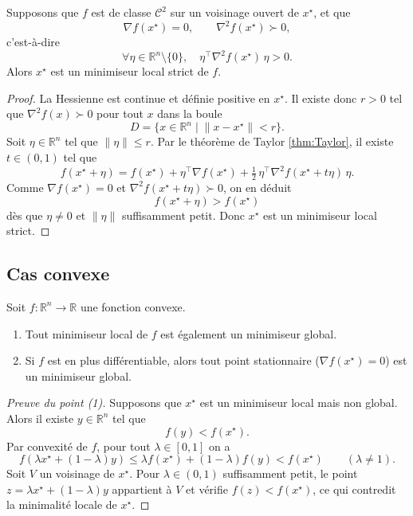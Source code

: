 \begin{theoreme}
\label{thm:second-order-sufficient}
Supposons que $f$ est de classe $\mathcal{C}^2$ sur un voisinage ouvert de $x^\star$,
et que
\[
    \nabla f(x^\star) = 0,\qquad
    \nabla^2 f(x^\star) \succ 0,
\]
c’est-à-dire
\[
    \forall \eta \in \mathbb{R}^n\setminus\{0\},\quad
    \eta^\top \nabla^2 f(x^\star)\,\eta > 0.
\]
Alors $x^\star$ est un minimiseur local strict de $f$.
\end{theoreme}

\begin{proof}
La Hessienne est continue et définie positive en $x^\star$. Il existe donc $r>0$ tel que
$\nabla^2 f(x) \succ 0$ pour tout $x$ dans la boule
\[
    D = \{ x \in \mathbb{R}^n \;|\; \|x - x^\star\| < r \}.
\]
Soit $\eta \in \mathbb{R}^n$ tel que $\|\eta\| \le r$.
Par le théorème de Taylor \ref{thm:Taylor}, il existe $t \in (0,1)$ tel que
\[
    f(x^\star + \eta)
    = f(x^\star)
      + \eta^\top \nabla f(x^\star)
      + \tfrac{1}{2}\,\eta^\top \nabla^2 f(x^\star + t\eta)\,\eta.
\]
Comme $\nabla f(x^\star) = 0$ et $\nabla^2 f(x^\star + t\eta) \succ 0$, on en déduit
\[
    f(x^\star + \eta) > f(x^\star)
\]
dès que $\eta \neq 0$ et $\|\eta\|$ suffisamment petit. Donc $x^\star$ est un
minimiseur local strict.
\end{proof}

\subsection{Cas convexe}
\label{subsec:2.2.5}

\begin{theoreme}
\label{thm:convex-case}
Soit $f : \mathbb{R}^n \to \mathbb{R}$ une fonction convexe.
\begin{enumerate}
    \item Tout minimiseur local de $f$ est également un minimiseur global.
    \item Si $f$ est en plus différentiable, alors tout point stationnaire
    ($\nabla f(x^\star) = 0$) est un minimiseur global.
\end{enumerate}
\end{theoreme}

\begin{proof}[Preuve du point (1)]
Supposons que $x^\star$ est un minimiseur local mais non global. Alors il existe
$y \in \mathbb{R}^n$ tel que
\[
    f(y) < f(x^\star).
\]
Par convexité de $f$, pour tout $\lambda \in [0,1]$ on a
\[
    f(\lambda x^\star + (1-\lambda)y)
    \le \lambda f(x^\star) + (1-\lambda) f(y) < f(x^\star) \qquad (\lambda \neq 1).
\]
Soit $V$ un voisinage de $x^\star$. Pour $\lambda \in (0,1)$ suffisamment petit,
le point $z = \lambda x^\star + (1-\lambda)y$ appartient à $V$ et vérifie
$f(z) < f(x^\star)$, ce qui contredit la minimalité locale de $x^\star$.
\end{proof}

